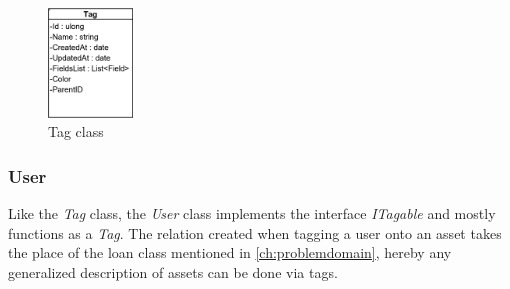 \begin{figure}[H]
    \centering
    \includegraphics[width=0.2\textwidth]{figures/Implementation/Models/Tag.PNG}
    \caption{Tag class}
    \label{fig:TagClass}
\end{figure}



\subsubsection{User} \label{sssc:Users}
Like the \textit{Tag} class, the \textit{User} class implements the interface \textit{ITagable} and mostly functions as a \textit{Tag}. The relation created when tagging a user onto an asset takes the place of the loan class mentioned in \autoref{ch:problemdomain}, hereby any generalized description of assets can be done via tags. 